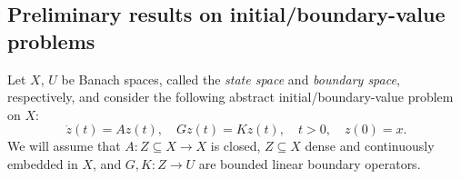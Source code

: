 \documentclass[a4paper,11pt,reqno]{amsart}
\def\sub{\subseteq}
\theoremstyle{plain}
\numberwithin{equation}{section}
\begin{document}
\subsection{Preliminary results on initial/boundary-value problems}\label{Sec:1.2}

Let ${X}$, ${U}$ be Banach spaces, called the \textit{state space} and \textit{boundary space}, respectively, and consider the following abstract initial/boundary-value problem on ${X}$:
\begin{equation}\label{dada}
\dot{z}(t)= {{A}} z(t),\quad{G}z(t)={K}z(t),\quad t>0,\quad z(0)=x.
\end{equation}
We will assume that ${{A}}:{Z}\sub {X}\to {X}$ is closed, ${Z}\sub {X}$ dense and continuously embedded in ${X}$, and $ {G},{K} :{Z}\to U$ are bounded linear boundary operators. 
\end{document}
